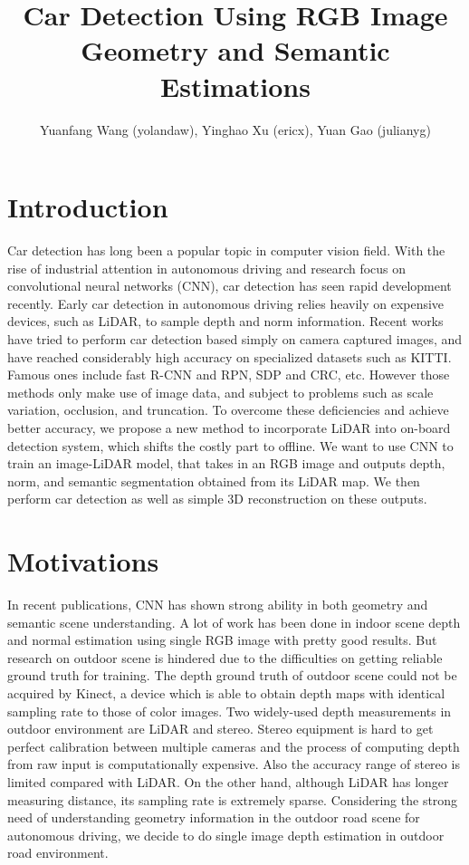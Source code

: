 \documentclass[a4paper]{article}
\title{Car Detection Using RGB Image Geometry and Semantic Estimations}
\author{Yuanfang Wang (yolandaw), Yinghao Xu (ericx), Yuan Gao (julianyg)}
\begin{document}
\maketitle


\section{Introduction}
Car detection has long been a popular topic in computer vision field. With the rise of industrial attention in autonomous driving and research focus on convolutional neural networks (CNN), car detection has seen rapid development recently. Early car detection in autonomous driving relies heavily on expensive devices, such as LiDAR, to sample depth and norm information. Recent works have tried to perform car detection based simply on camera captured images, and have reached considerably high accuracy on specialized datasets such as KITTI. Famous ones include fast R-CNN and RPN\cite{renFasterRCNN}, SDP and CRC\cite{sdpcrc}, etc. However those methods only make use of image data, and subject to problems such as scale variation, occlusion, and truncation\cite{subcatCNN}. To overcome these deficiencies and achieve better accuracy, we propose a new method to incorporate LiDAR into on-board detection system, which shifts the costly part to offline. We want to use CNN to train an image-LiDAR model, that takes in an RGB image and outputs depth, norm, and semantic segmentation obtained from its LiDAR map. We then perform car detection as well as simple 3D reconstruction on these outputs.

\section{Motivations}
In recent publications, CNN has shown strong ability in both geometry and semantic scene understanding. A lot of work has been done in indoor scene depth and normal estimation using single RGB image with pretty good results\cite{laina2016deeper}\cite{li2015depth}\cite{hane2015direction}\cite{eigen2015predicting}. But research on outdoor scene is hindered due to the difficulties on getting reliable ground truth for training. The depth ground truth of outdoor scene could not be acquired by Kinect, a device which is able to obtain depth maps with identical sampling rate to those of color images. Two widely-used depth measurements in outdoor environment are LiDAR and stereo. Stereo equipment is hard to get perfect calibration between multiple cameras and the process of computing depth from raw input is computationally expensive. Also the accuracy range of stereo is limited compared with LiDAR. On the other hand, although LiDAR has longer measuring distance, its sampling rate is extremely sparse. Considering the strong need of understanding geometry information in the outdoor road scene for autonomous driving, we decide to do single image depth estimation in outdoor road environment. 
\end{document}

